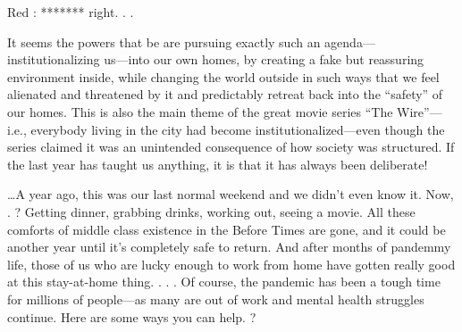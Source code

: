 \begin{refsection}
\begin{tcolorbox}[quote]
Red : ******* right. . .\textsuperscript{\cite{urlas9u4123}}

\end{tcolorbox}

It seems the powers that be are pursuing exactly such an agenda---institutionalizing us---into our own homes, by creating a fake but reassuring environment inside, while changing the world outside in such ways that we feel alienated and threatened by it and predictably retreat back into the \enquote{safety} of our homes. This is also the main theme of the great movie series \enquote{The Wire}---i.e., everybody living in the city had become institutionalized---even though the series claimed it was an unintended consequence of how society was structured. If the last year has taught us anything, it is that it has always been deliberate!

\begin{tcolorbox}[quote]

\dots{}A year ago, this was our last normal weekend and we didn't even know it. Now, . ? Getting dinner, grabbing drinks, working out, seeing a movie. All these comforts of middle class existence in the Before Times are gone, and it could be another year until it's completely safe to return. And after months of pandemmy life, those of us who are lucky enough to work from home have gotten really good at this stay-at-home thing. . . . Of course, the pandemic has been a tough time for millions of people---as many are out of work and mental health struggles\textsuperscript{\cite{urlbcf12af5}} continue. Here are some ways you can help.\textsuperscript{\cite{urlf1c27d1d}} ?

\end{tcolorbox}

\printbibliography[heading=subbibliography]

\end{refsection}
